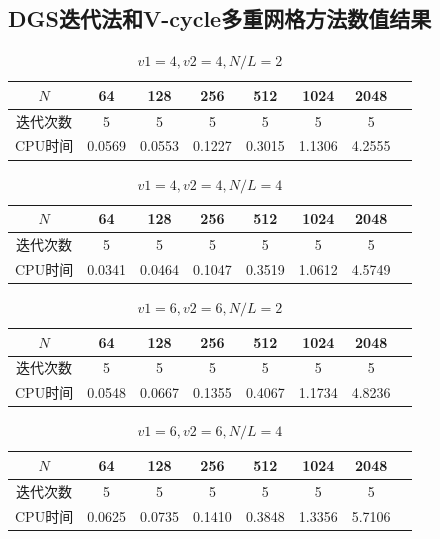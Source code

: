 \documentclass{article}
\begin{document}
\subsection{DGS迭代法和V-cycle多重网格方法数值结果}
\begin{table}[!h]
  \centering
  \caption{$v1 = 4, v2 = 4, N/L = 2$}
  \begin{tabular}{cccccccc}
    \toprule
    $N$ & 64 & 128 & 256 & 512 & 1024 & 2048  \\
    \midrule
    迭代次数 & 5 & 5 & 5 & 5 & 5 & 5 \\
    CPU时间 & 0.0569 & 0.0553 & 0.1227 & 0.3015 & 1.1306 & 4.2555  \\
    \bottomrule
  \end{tabular}
\end{table}
\vspace{-20pt}
\begin{table}[!h]
  \centering
  \caption{$v1 = 4, v2 = 4, N/L = 4$}
  \begin{tabular}{cccccccc}
    \toprule
    $N$ & 64 & 128 & 256 & 512 & 1024 & 2048  \\
    \midrule
    迭代次数 & 5 & 5 & 5 & 5 & 5 & 5 \\
    CPU时间 & 0.0341 & 0.0464 & 0.1047 & 0.3519 & 1.0612 & 4.5749  \\
    \bottomrule
  \end{tabular}
\end{table}
\vspace{-20pt}
\begin{table}[!h]
  \centering
  \caption{$v1 = 6, v2 = 6, N/L = 2$}
  \begin{tabular}{cccccccc}
    \toprule
    $N$ & 64 & 128 & 256 & 512 & 1024 & 2048  \\
    \midrule
    迭代次数 & 5 & 5 & 5 & 5 & 5 & 5 \\
    CPU时间 & 0.0548 & 0.0667 & 0.1355 & 0.4067 & 1.1734 & 4.8236  \\
    \bottomrule
  \end{tabular}
\end{table}
\vspace{-20pt}

\begin{table}[!h]
  \centering
  \caption{$v1 = 6, v2 = 6, N/L = 4$}
  \begin{tabular}{cccccccc}
    \toprule
    $N$ & 64 & 128 & 256 & 512 & 1024 & 2048  \\
    \midrule
    迭代次数 & 5 & 5 & 5 & 5 & 5 & 5 \\
    CPU时间 & 0.0625 & 0.0735 & 0.1410 & 0.3848 & 1.3356 & 5.7106  \\
    \bottomrule
  \end{tabular}
\end{table}
\end{document}
